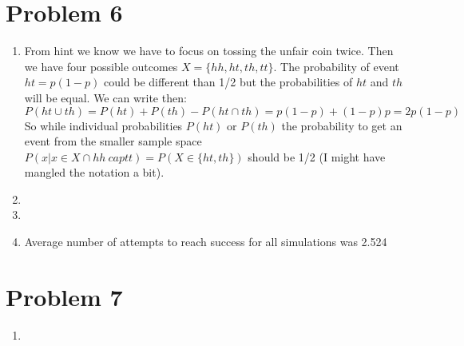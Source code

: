 \documentclass{article}
\newcommand{\1}{\mathbf{1}}
\begin{document}
\newpage
\section*{Problem 6}
\begin{enumerate}
    \item From hint we know we have to focus on tossing the unfair coin twice. Then we have four possible outcomes $X=\{hh, ht, th, tt\}$. The probability of event $ht = p(1-p)$ could be different than 1/2 but the probabilities of $ht$ and $th$ will be equal. We can write then:
    $$P(ht \cup th) = P(ht) + P(th) - P(ht \cap th) = p(1-p) + (1-p)p = 2p(1-p)$$
    So while individual probabilities $P(ht)$ or $P(th)$ the probability to get an event from the smaller sample space $P(x|x \in X \cap hh \ cap tt) = P(X\in\{ht, th\})$ should be 1/2 (I might have mangled the notation a bit).
    
    \item 
    
    \item 
    
    \item Average number of attempts to reach success for all simulations was 2.524
\end{enumerate}


\newpage
\section*{Problem 7}
\begin{enumerate}
    \item 
\end{enumerate}
\end{document}
